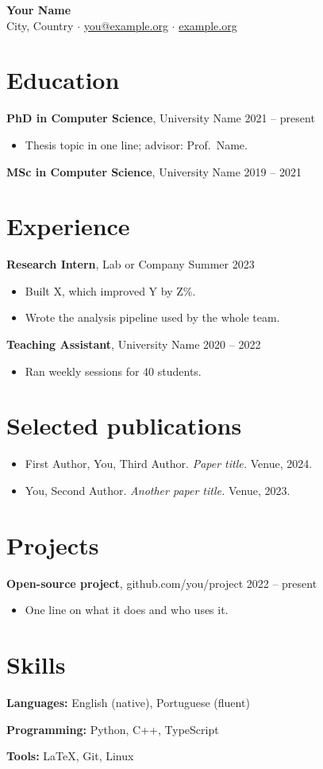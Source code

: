 \documentclass[10pt,a4paper]{article}
\newcommand{\entry}[3]{\textbf{#1}, #2 \hfill #3\par}
\begin{document}
\begin{center}
  {\LARGE\bfseries Your Name}\\[3pt]
  City, Country \quad $\cdot$ \quad
  \href{mailto:you@example.org}{you@example.org} \quad $\cdot$ \quad
  \href{https://example.org}{example.org}
\end{center}

\section{Education}
\entry{PhD in Computer Science}{University Name}{2021 -- present}
\begin{itemize}
  \item Thesis topic in one line; advisor: Prof.\ Name.
\end{itemize}
\entry{MSc in Computer Science}{University Name}{2019 -- 2021}

\section{Experience}
\entry{Research Intern}{Lab or Company}{Summer 2023}
\begin{itemize}
  \item Built X, which improved Y by Z\%.
  \item Wrote the analysis pipeline used by the whole team.
\end{itemize}
\entry{Teaching Assistant}{University Name}{2020 -- 2022}
\begin{itemize}
  \item Ran weekly sessions for 40 students.
\end{itemize}

\section{Selected publications}
\begin{itemize}
  \item First Author, You, Third Author. \textit{Paper title.} Venue, 2024.
  \item You, Second Author. \textit{Another paper title.} Venue, 2023.
\end{itemize}

\section{Projects}
\entry{Open-source project}{github.com/you/project}{2022 -- present}
\begin{itemize}
  \item One line on what it does and who uses it.
\end{itemize}

\section{Skills}
\textbf{Languages:} English (native), Portuguese (fluent)\par
\textbf{Programming:} Python, C++, TypeScript\par
\textbf{Tools:} \LaTeX, Git, Linux
\end{document}
